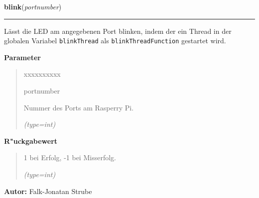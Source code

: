\hspace{.8\funcindent}\begin{boxedminipage}{\funcwidth}

    \raggedright \textbf{blink}(\textit{portnumber})

    \vspace{-1.5ex}

    \rule{\textwidth}{0.5\fboxrule}
\setlength{\parskip}{2ex}
    Lässt die LED am angegebenen Port blinken, indem der ein Thread in der 
    globalen Variabel \texttt{blinkThread} als \texttt{blinkThreadFunction}
    gestartet wird.

\setlength{\parskip}{1ex}
      \textbf{Parameter}
      \vspace{-1ex}

      \begin{quote}
        \begin{Ventry}{xxxxxxxxxx}

          \item[portnumber]

          Nummer des Ports am Rasperry Pi.

            {\it (type=int)}

        \end{Ventry}

      \end{quote}

      \textbf{R"uckgabewert}
    \vspace{-1ex}

      \begin{quote}
      1 bei Erfolg, -1 bei Misserfolg.

      {\it (type=int)}

      \end{quote}

\textbf{Autor:} Falk-Jonatan Strube



    \end{boxedminipage}

    \label{ledleuchtturm:ledFunc:blinkThreadFunction}

    \vspace{0.5ex}

